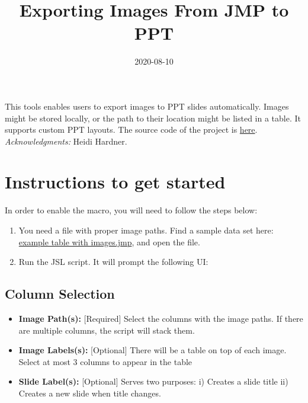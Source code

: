 \documentclass[
]{article}
\title{Exporting Images From JMP to PPT}
\author{}
\date{\vspace{-2.5em}2020-08-10}
\providecommand{\tightlist}{%
  \setlength{\itemsep}{0pt}\setlength{\parskip}{0pt}}
\begin{document}
\maketitle

{
\setcounter{tocdepth}{2}
\tableofcontents
}
\hypertarget{TOC}{}

This tools enables users to export images to PPT slides automatically. Images might be stored locally, or the path to their location might be listed in a table. It supports custom PPT layouts. The source code of the project is \href{https://github.com/quarktetra/JMP_Discovery_2020_git_demo/blob/master/IMAGETABLE_TO_PPT.jsl}{here}.
\emph{Acknowledgments:} Heidi Hardner.

\hypertarget{instructions-to-get-started}{%
\section{Instructions to get started}\label{instructions-to-get-started}}

In order to enable the macro, you will need to follow the steps below:

\begin{enumerate}
\def\labelenumi{\arabic{enumi}.}
\tightlist
\item
  You need a file with proper image paths. Find a sample data set here: \href{https://github.com/quarktetra/JMP_Discovery_2020_git_demo/raw/master/MET_OBJECTS_WITH_PATHS_simplified.jmp}{example table with images.jmp}, and open the file.
\item
  Run the JSL script. It will prompt the following UI:
\end{enumerate}

\hypertarget{column-selection}{%
\subsection{Column Selection}\label{column-selection}}

\begin{itemize}
\tightlist
\item
  \textbf{Image Path(s):} {[}Required{]} Select the columns with the image paths. If there are multiple columns, the script will stack them.
\item
  \textbf{Image Labels(s):} {[}Optional{]} There will be a table on top of each image. Select at most 3 columns to appear in the table
\item
  \textbf{Slide Label(s):} {[}Optional{]} Serves two purposes: i) Creates a slide title ii) Creates a new slide when title changes.
\end{itemize}
\end{document}
